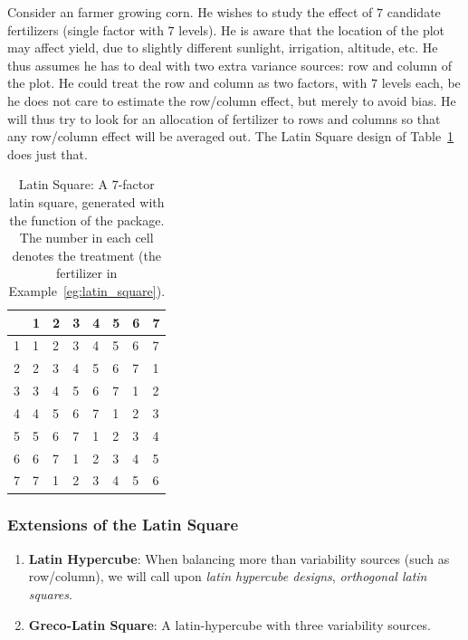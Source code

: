 \begin{example}
\label{eg:latin_square}
Consider an farmer growing corn.
He wishes to study the effect of $7$ candidate fertilizers (single factor with $7$ levels).
He is aware that the location of the plot may affect yield, due to slightly different sunlight, irrigation, altitude, etc.
He thus assumes he has to deal with two extra variance sources: row and column of the plot. 
He could treat the row and column as two factors, with $7$ levels each, be he does not care to estimate the row/column effect, but merely to avoid bias.
He will thus try to look for an allocation of fertilizer to rows and columns so that any row/column effect will be averaged out.
The Latin Square design of Table~\ref{tab:latin_square} does just that.
\end{example}
\begin{table}[ht]
\centering
\begin{tabular}{rlllllll}
  \hline
 & 1 & 2 & 3 & 4 & 5 & 6 & 7 \\ 
  \hline
1 & 1 & 2 & 3 & 4 & 5 & 6 & 7 \\ 
  2 & 2 & 3 & 4 & 5 & 6 & 7 & 1 \\ 
  3 & 3 & 4 & 5 & 6 & 7 & 1 & 2 \\ 
  4 & 4 & 5 & 6 & 7 & 1 & 2 & 3 \\ 
  5 & 5 & 6 & 7 & 1 & 2 & 3 & 4 \\ 
  6 & 6 & 7 & 1 & 2 & 3 & 4 & 5 \\ 
  7 & 7 & 1 & 2 & 3 & 4 & 5 & 6 \\ 
   \hline
\end{tabular}
\label{tab:latin_square}
\caption{Latin Square: A $7$-factor latin square, generated with the  function of the  \R package.
The number in each cell denotes the treatment (the fertilizer in Example~\ref{eg:latin_square}).}
\end{table}

\subsubsection{Extensions of the Latin Square}
\begin{enumerate}
\item \textbf{Latin Hypercube}: When balancing more than variability sources (such as row/column), we will call upon \emph{latin hypercube designs}, \aka \emph{orthogonal latin squares}. 
\item \textbf{Greco-Latin Square}: A latin-hypercube with three variability sources. 
\end{enumerate}





